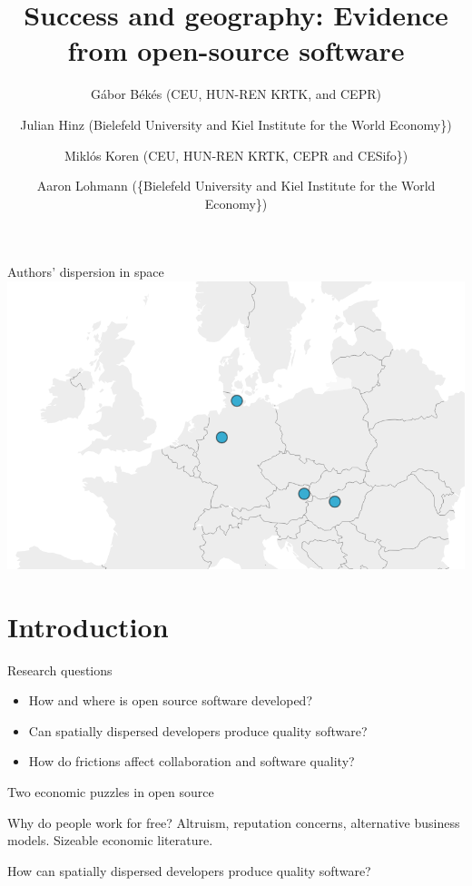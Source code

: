 \documentclass[
  ignorenonframetext,
  aspectratio=169,
]{beamer}
\title{Success and geography: Evidence from open-source software}
\author{Gábor Békés (CEU, HUN-REN KRTK, and CEPR) \and Julian Hinz
(Bielefeld University and Kiel Institute for the World
Economy\}) \and Miklós Koren (CEU, HUN-REN KRTK, CEPR and
CESifo\}) \and Aaron Lohmann (\{\footnotesize Bielefeld University and
Kiel Institute for the World Economy\})}
\date{June 21, 2024\footnote<.->{This work was funded by the European
  Union under the Horizon Europe grant 101061123. Views and opinions
  expressed are, however, those of the author(s) only and do not
  necessarily reflect those of the European Union or the European
  Commission. Neither the European Union nor the granting authority can
  be held responsible for them.}}
\providecommand{\tightlist}{%
  \setlength{\itemsep}{0pt}\setlength{\parskip}{0pt}}
\begin{document}
\frame{\titlepage}

\begin{frame}{Authors' dispersion in space}
\protect\hypertarget{authors-dispersion-in-space}{}
\includegraphics{images/authors-space.png}
\end{frame}

\section{Introduction}\label{introduction}

\begin{frame}{Research questions}
\protect\hypertarget{research-questions}{}
\begin{itemize}
\tightlist
\item
  How and where is open source software developed?
\item
  Can spatially dispersed developers produce quality software?
\item
  How do frictions affect collaboration and software quality?
\end{itemize}
\end{frame}

\begin{frame}{Two economic puzzles in open source}
\protect\hypertarget{two-economic-puzzles-in-open-source}{}
\begin{block}{Why do people work for free?}
\protect\hypertarget{why-do-people-work-for-free}{}
Altruism, reputation concerns, alternative business models. Sizeable
economic literature.
\end{block}

\begin{block}{How can spatially dispersed developers produce quality
software?}
\protect\hypertarget{how-can-spatially-dispersed-developers-produce-quality-software}{}
\end{block}
\end{frame}
\end{document}
